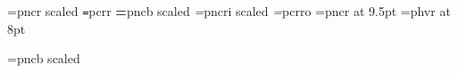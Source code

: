 \def\leadline{\ \leaders\hrule height 2.5pt depth -2pt\hfil\ }
\def\manvers{}%
\def\HEADINGSoff{
\global\evenheadline={\hfil}
\global\evenfootline={\line{\let\,\leadline\manvers}}
\global\oddheadline={\hfil}
\global\oddfootline={\line {\let\,\leadline\manvers}}}
\def\HEADINGSsingle{
\global\pageno=1\HEADINGSsinglex}
\def\HEADINGSsinglex{
\global\evenfootline={%
\leadline\manvers}
\global\oddfootline={%
\leadline\manvers}
\global\evenheadline={\ftfnt\thischapter\leadline
		\ifdraft DRAFT\leadline\fi
		\bf\folio}
\global\oddheadline={\ftfnt\thischapter\leadline
		\ifdraft DRAFT\leadline\fi
		\bf\folio}
}
%
\def\HEADINGSdouble{
\global\pageno=1\HEADINGSdoublex}
\def\HEADINGSdoublex{
\global\evenfootline={%
{\bf\folio}\ftfnt\leadline\ifdraft DRAFT\quad\fi
\ftfnt\manvers\qquad
}
\ifx\specialOddFootline\undefined
\global\oddfootline={%
\leadline{\bf\folio}%
}
\else
\global\oddfootline=\specialOddFootline
\fi
\global\evenheadline={\ftfnt\thistitle\leadline\ifdraft DRAFT\fi}
\global\oddheadline={\rm\leadline\thischapter}
}

\def\finalout{\overfullrule=0pt
	\global\draftfalse
			}

\font\textrm=pncr scaled \magstephalf
\font\texttt=pcrr
\font\textbf=pncb scaled \magstephalf 
\font\textit=pncri scaled \magstephalf
\font\textsl=pcrro
\font\textsf=pncr at 9.5pt
\font\ftfnt=phvr at 8pt %

\font{}=pncb scaled  %

